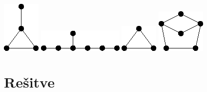 \documentclass[11pt,paper=b5,footinclude,headinclude]{scrbook} %
\begin{document}
\includegraphics[scale=0.5,frame]{smallGraphs/g_paw.png}     
\includegraphics[scale=0.5,frame]{smallGraphs/g_skewstar.png}     
\includegraphics[scale=0.5,frame]{smallGraphs/g_triangle.png}     
\includegraphics[scale=0.5,frame]{smallGraphs/g_twinC5.png}     

\chapter{Rešitve} 
 
\end{document}
